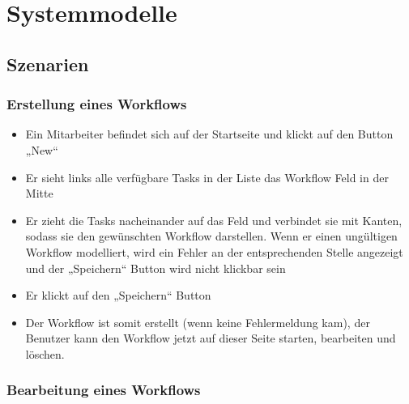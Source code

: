 
\chapter{Systemmodelle}

    \section{Szenarien}

        \subsection{Erstellung eines Workflows}
        
        \begin{itemize}

            \item Ein Mitarbeiter befindet sich auf der Startseite und klickt auf den Button „New“

            \item Er sieht links alle verfügbare Tasks in der Liste das Workflow Feld in der Mitte

            \item Er zieht die Tasks nacheinander auf das Feld und verbindet sie mit Kanten, sodass sie den gewünschten Workflow darstellen. Wenn er einen ungültigen Workflow modelliert, wird ein Fehler an der entsprechenden Stelle angezeigt und der „Speichern“ Button wird nicht klickbar sein

            \item Er klickt auf den „Speichern“ Button

            \item Der Workflow ist somit erstellt (wenn keine Fehlermeldung kam), der Benutzer kann den Workflow jetzt auf dieser Seite starten, bearbeiten und löschen.

        \end{itemize}

        \subsection{Bearbeitung eines Workflows}

